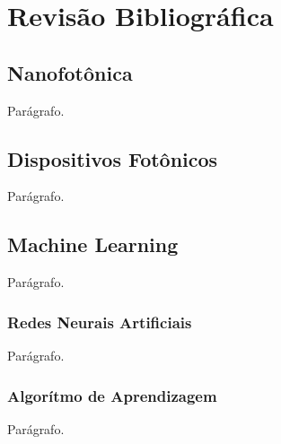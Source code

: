 \chapter{Revisão Bibliográfica}



\section{Nanofotônica}

Parágrafo.

\section{Dispositivos Fotônicos}

Parágrafo.



\section{Machine Learning}

Parágrafo.

\subsection{Redes Neurais Artificiais}

Parágrafo.


\subsection{Algorítmo de Aprendizagem}

Parágrafo.
